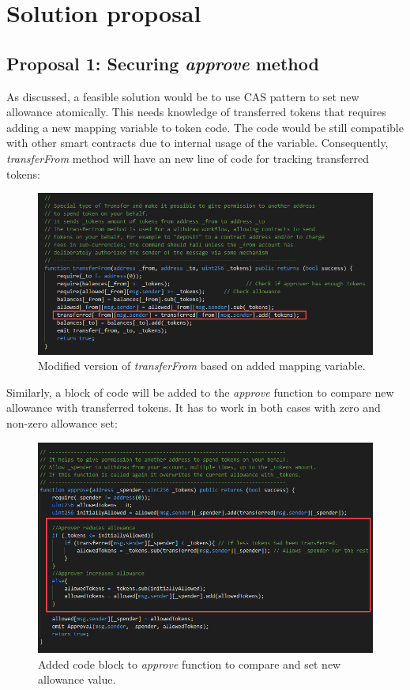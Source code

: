 
\section{Solution proposal}
\subsection{Proposal 1: Securing \textit{approve} method}
As discussed, a feasible solution would be to use CAS pattern to set new allowance atomically. This needs knowledge of transferred tokens that requires adding a new mapping variable to token code. The code would be still compatible with other smart contracts due to internal usage of the variable. Consequently, \textit{transferFrom} method will have an new line of code for tracking transferred tokens:
\begin{figure}[H]
	\centering
	\includegraphics[width=1.0\linewidth]{figures/multiple_withdrawal_14.png}
	\caption{Modified version of \textit{transferFrom} based on added mapping variable.}
\end{figure}
\noindent Similarly, a block of code will be added to the \textit{approve} function to compare new allowance with transferred tokens. It has to work in both cases with zero and non-zero allowance set:
\begin{figure}[H]
	\centering
	\includegraphics[width=1.0\linewidth]{figures/multiple_withdrawal_15.png}
	\caption{Added code block to \textit{approve} function to compare and set new allowance value.}
\end{figure}

